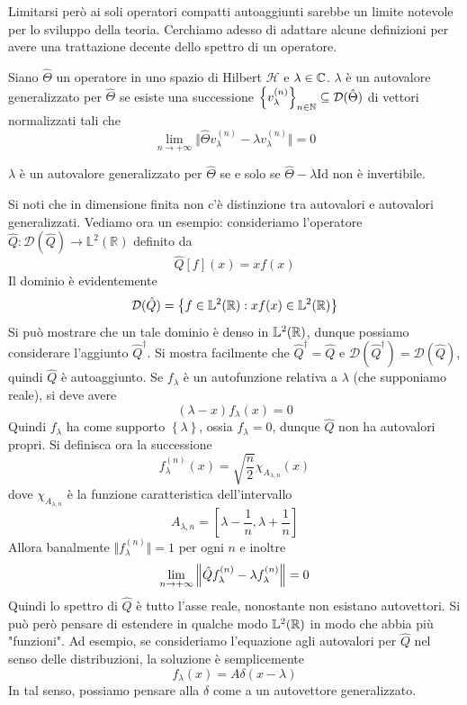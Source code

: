 \documentclass[a4paper, 11pt]{article}
\renewcommand{\H}{\mathcal{H}}
\newcommand{\id}{\mathrm{Id}}
\renewcommand{\L}{\mathbb{L}}
\newcommand{\pos}{\hat{Q}}
\begin{document}
Limitarsi però ai soli operatori compatti autoaggiunti sarebbe un limite notevole per lo sviluppo della teoria. Cerchiamo adesso di adattare alcune definizioni per avere una trattazione decente dello spettro di un operatore.
\begin{definition}
	Siano $\hat{\Theta}$ un operatore in uno spazio di Hilbert $\H$ e $\lambda\in\mathbb{C}$. $\lambda$ è un autovalore generalizzato per $\hat{\Theta}$ se esiste una successione $\left\{v^{(n)}_\lambda\right\}_{n\in\mathbb{N}}\subseteq\mathcal{D}(\hat{\Theta})$ di vettori normalizzati tali che
	\[\lim\limits_{n\to+\infty}\Vert\hat{\Theta}v^{(n)}_\lambda-\lambda v^{(n)}_\lambda\Vert=0\] 
\end{definition}
\begin{theorem}[Weyl]
	$\lambda$ è un autovalore generalizzato per $\hat{\Theta}$ se e solo se $\hat{\Theta}-\lambda\id$ non è invertibile.
\end{theorem}
Si noti che in dimensione finita non c'è distinzione tra autovalori e autovalori generalizzati. Vediamo ora un esempio: consideriamo l'operatore $\hat{Q}\colon\mathcal{D}(\hat{Q})\to\mathbb{L}^2(\mathbb{R})$ definito da
\[\pos[f](x)=xf(x)\]
Il dominio è evidentemente
\[\mathcal{D}(\pos)=\left\{f\in\L^2(\R):xf(x)\in\L^2(\R)\right\}\]
Si può mostrare che un tale dominio è denso in $\L^2(\R)$, dunque possiamo considerare l'aggiunto $\pos^\dagger$. Si mostra facilmente che $\pos^\dagger=\pos$ e $\mathcal{D}(\pos^\dagger)=\mathcal{D}(\pos)$, quindi $\pos$ è autoaggiunto. Se $f_\lambda$ è un autofunzione relativa a $\lambda$ (che supponiamo reale), si deve avere
\[(\lambda-x)f_\lambda(x)=0\]
Quindi $f_\lambda$ ha come supporto $\left\{\lambda\right\}$, ossia $f_\lambda=0$, dunque $\pos$ non ha autovalori propri. Si definisca ora la successione
\[f^{(n)}_\lambda(x)=\sqrt{\frac{n}{2}}\chi_{A_{\lambda,n}}(x)\]
dove $\chi_{A_{\lambda,n}}$ è la funzione caratteristica dell'intervallo
\[A_{\lambda,n}=\left[\lambda-\frac{1}{n},\lambda+\frac{1}{n}\right]\]
Allora banalmente $\Vert f^{(n)}_\lambda\Vert=1$ per ogni $n$ e inoltre
\[\lim\limits_{n\to+\infty}\norm{\pos f^{(n)}_\lambda-\lambda f^{(n)}_{\lambda}}=0\]
Quindi lo spettro di $\pos$ è tutto l'asse reale, nonostante non esistano autovettori. Si può però pensare di estendere in qualche modo $\L^2(\R)$ in modo che abbia più "funzioni". Ad esempio, se consideriamo l'equazione agli autovalori per $\pos$ nel senso delle distribuzioni, la soluzione è semplicemente
\[f_\lambda(x)=A\delta(x-\lambda)\]
In tal senso, possiamo pensare alla $\delta$ come a un autovettore generalizzato.
\end{document}
